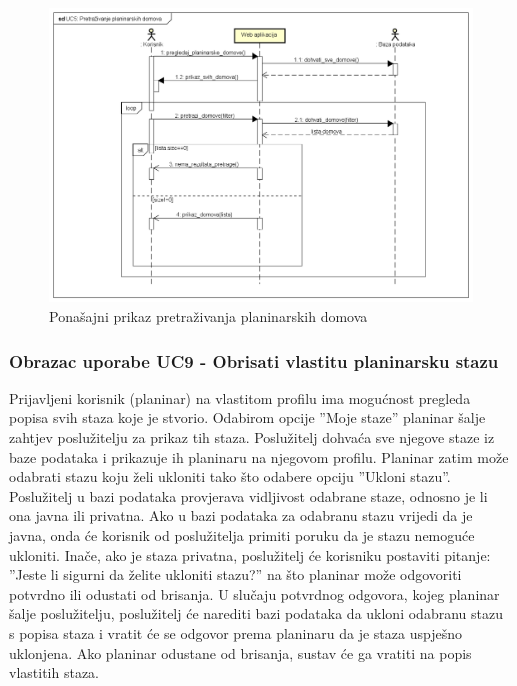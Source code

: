 				\begin{figure}[H]
					\includegraphics[scale=0.5]{dijagrami/seq-planinarski-domovi.png} %
					\centering
					\caption{Ponašajni prikaz pretraživanja planinarskih domova}
					\label{fig:UC dijagrami}
				\end{figure}
				
			

				\subsubsection{Obrazac uporabe UC9 - Obrisati vlastitu planinarsku stazu}

				Prijavljeni korisnik (planinar) na vlastitom profilu ima mogućnost pregleda popisa svih staza koje je stvorio. Odabirom opcije ''Moje staze'' planinar šalje zahtjev poslužitelju za prikaz tih staza. Poslužitelj dohvaća sve njegove staze iz baze podataka i prikazuje ih planinaru na njegovom profilu. Planinar zatim može odabrati stazu koju želi ukloniti tako što odabere opciju ''Ukloni stazu''. Poslužitelj u bazi podataka provjerava vidljivost odabrane staze, odnosno je li ona javna ili privatna.  Ako u bazi podataka za odabranu stazu vrijedi da je javna, onda će korisnik od poslužitelja primiti poruku da je stazu nemoguće ukloniti. Inače, ako je staza privatna, poslužitelj će korisniku postaviti pitanje: ''Jeste li sigurni da želite ukloniti stazu?'' na što planinar može odgovoriti potvrdno ili odustati od brisanja. U slučaju potvrdnog odgovora, kojeg planinar šalje poslužitelju, poslužitelj će narediti bazi podataka da ukloni odabranu stazu s popisa staza i vratit će se odgovor prema planinaru da je staza uspješno uklonjena. Ako planinar odustane od brisanja, sustav će ga vratiti na popis vlastitih staza. 

